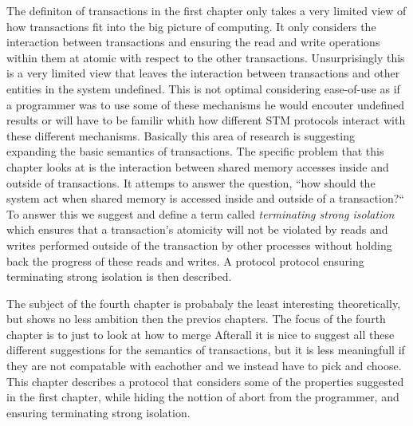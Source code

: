 The definiton of transactions in the first chapter only takes a very limited view of how
transactions fit into the big picture of computing.
It only considers the interaction between transactions and ensuring the read and write
operations within them at atomic with respect to the other transactions.
Unsurprisingly this is a very limited view that leaves the interaction between
transactions and other entities in the system undefined.
This is not optimal considering ease-of-use as if a programmer was to use
some of these mechanisms he would encouter undefined results or will have
to be familir whith how different STM protocols interact with these different mechanisms.
Basically this area of research is suggesting expanding the basic semantics of transactions.
The specific problem that this chapter looks at is the interaction between shared memory
accesses inside and outside of transactions.
It attemps to answer the question, ``how should the system act when shared memory
is accessed inside and outside of a transaction?``
To answer this we suggest and define a term called \emph{terminating strong isolation} which ensures
that a transaction's atomicity will not be violated by reads and writes performed
outside of the transaction by other processes without holding back the progress of
these reads and writes.
A protocol protocol ensuring terminating strong isolation is then described.

The subject of the fourth chapter is probabaly the least interesting theoretically, but
shows no less ambition then the previos chapters.
The focus of the fourth chapter is to just to look at how to merge 
Afterall it is nice to suggest all these different suggestions for the semantics
of transactions, but it is less meaningfull if they are not compatable with
eachother and we instead have to pick and choose.
This chapter describes a protocol that considers some of the properties suggested
in the first chapter, while hiding the nottion of abort from the programmer,
and ensuring terminating strong isolation. 








